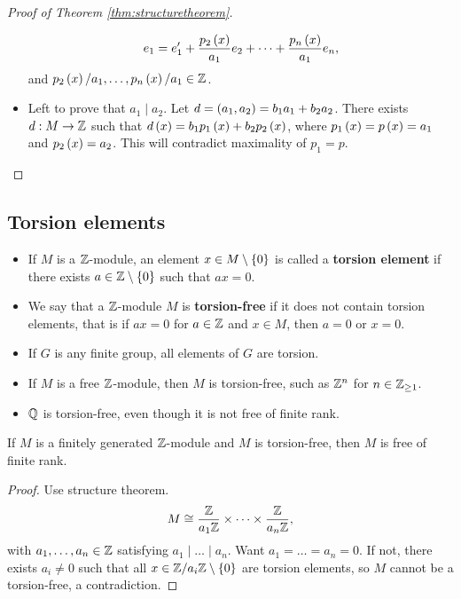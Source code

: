 \begin{proof}[Proof of Theorem \ref{thm:structuretheorem}]
\begin{itemize}
$$ e_1 = e_1' + \dfrac{p_2\left( x \right)}{a_1}e_2 + \dots + \dfrac{p_n\left( x \right)}{a_1}e_n, $$
and $ p_2\left( x \right) / a_1, \dots, p_n\left( x \right) / a_1 \in \mathbb{Z} $.
\item Left to prove that $ a_1 \mid a_2 $. Let $ d = \left( a_1, a_2 \right) = b_1a_1 + b_2a_2 $. There exists $ d : M \to \mathbb{Z} $ such that $ d\left( x \right) = b_1p_1\left( x \right) + b_2p_2\left( x \right) $, where $ p_1\left( x \right) = p\left( x \right) = a_1 $ and $ p_2\left( x \right) = a_2 $. This will contradict maximality of $ p_1 = p $.
\end{itemize}
\end{proof}


\subsection{Torsion elements}

\begin{definition}
\hfill
\begin{itemize}
\item If $ M $ is a $ \mathbb{Z} $-module, an element $ x \in M \setminus \left\{ 0 \right\} $ is called a \textbf{torsion element} if there exists $ a \in \mathbb{Z} \setminus \left\{ 0 \right\} $ such that $ ax = 0 $.
\item We say that a $ \mathbb{Z} $-module $ M $ is \textbf{torsion-free} if it does not contain torsion elements, that is if $ ax = 0 $ for $ a \in \mathbb{Z} $ and $ x \in M $, then $ a = 0 $ or $ x = 0 $.
\end{itemize}
\end{definition}

\begin{example*}
\hfill
\begin{itemize}
\item If $ G $ is any finite group, all elements of $ G $ are torsion.
\item If $ M $ is a free $ \mathbb{Z} $-module, then $ M $ is torsion-free, such as $ \mathbb{Z}^n $ for $ n \in \mathbb{Z}_{\ge 1} $.
\item $ \mathbb{Q} $ is torsion-free, even though it is not free of finite rank.
\end{itemize}
\end{example*}

\begin{proposition}
If $ M $ is a finitely generated $ \mathbb{Z} $-module and $ M $ is torsion-free, then $ M $ is free of finite rank.
\end{proposition}

\begin{proof}
Use structure theorem.
$$ M \cong \dfrac{\mathbb{Z}}{a_1\mathbb{Z}} \times \dots \times \dfrac{\mathbb{Z}}{a_n\mathbb{Z}}, $$
with $ a_1, \dots, a_n \in \mathbb{Z} $ satisfying $ a_1 \mid \dots \mid a_n $. Want $ a_1 = \dots = a_n = 0 $. If not, there exists $ a_i \ne 0 $ such that all $ x \in \mathbb{Z} / a_i\mathbb{Z} \setminus \left\{ 0 \right\} $ are torsion elements, so $ M $ cannot be a torsion-free, a contradiction.
\end{proof}

